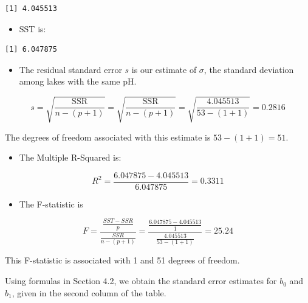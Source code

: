 \documentclass[
  letterpaper,
  DIV=11,
  numbers=noendperiod]{scrreprt}
\newenvironment{Shaded}{\begin{snugshade}}{\end{snugshade}}
\newcommand{\DecValTok}[1]{\textcolor[rgb]{0.68,0.00,0.00}{#1}}
\newcommand{\FunctionTok}[1]{\textcolor[rgb]{0.28,0.35,0.67}{#1}}
\newcommand{\NormalTok}[1]{\textcolor[rgb]{0.00,0.23,0.31}{#1}}
\newcommand{\SpecialCharTok}[1]{\textcolor[rgb]{0.37,0.37,0.37}{#1}}
\providecommand{\tightlist}{%
  \setlength{\itemsep}{0pt}\setlength{\parskip}{0pt}}\usepackage{longtable,booktabs,array}
\begin{document}
\begin{verbatim}
[1] 4.045513
\end{verbatim}

\begin{itemize}
\tightlist
\item
  SST is:
\end{itemize}

\begin{Shaded}
\end{Shaded}

\begin{verbatim}
[1] 6.047875
\end{verbatim}

\begin{itemize}
\tightlist
\item
  The residual standard error \(s\) is our estimate of \(\sigma\), the
  standard deviation among lakes with the same pH.
\end{itemize}

\[ s =\sqrt{\frac{\text{SSR}}{n-(p+1)}} = \sqrt{\frac{\text{SSR}}{n-(p+1)}} = \sqrt{\frac{4.045513}{53-(1+1)}}=0.2816 \]

The degrees of freedom associated with this estimate is
\(53-(1+1) = 51\).

\begin{itemize}
\tightlist
\item
  The Multiple R-Squared is:
\end{itemize}

\[ R^2 = \frac{6.047875 - 4.045513}{6.047875} = 0.3311 \]

\begin{itemize}
\tightlist
\item
  The F-statistic is
\end{itemize}

\[ F=\frac{\frac{SST - SSR}{p}}{\frac{SSR}{n-(p+1)}} = \frac{\frac{6.047875 - 4.045513}{1}}{\frac{4.045513}{53-(1+1)}} = 25.24 \]

This F-statistic is associated with 1 and 51 degrees of freedom.

Using formulas in Section 4.2, we obtain the standard error estimates
for \(b_0\) and \(b_1\), given in the second column of the table.
\end{document}
